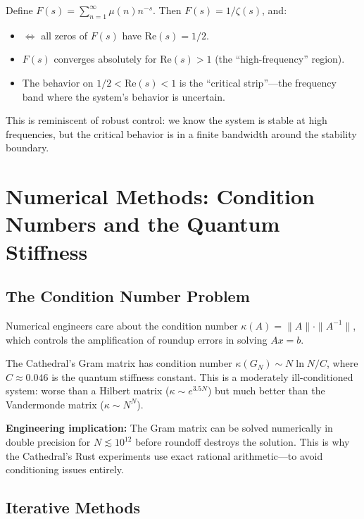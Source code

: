 \documentclass[11pt,a4paper]{article}
\begin{document}
Define $F(s) = \sum_{n=1}^{\infty} \mu(n) n^{-s}$. Then
$F(s) = 1/\zeta(s)$, and:
\begin{itemize}
  \item \RH{} $\iff$ all zeros of $F(s)$ have $\mathrm{Re}(s) = 1/2$.
  \item $F(s)$ converges absolutely for $\mathrm{Re}(s) > 1$ (the
    ``high-frequency'' region).
  \item The behavior on $1/2 < \mathrm{Re}(s) < 1$ is the ``critical
    strip''---the frequency band where the system's behavior is
    uncertain.
\end{itemize}

This is reminiscent of robust control: we know the system is stable
at high frequencies, but the critical behavior is in a finite
bandwidth around the stability boundary.

\section{Numerical Methods: Condition Numbers and the Quantum Stiffness}
\label{sec:numerical}

\subsection{The Condition Number Problem}

Numerical engineers care about the condition number
$\kappa(A) = \|A\| \cdot \|A^{-1}\|$, which controls the
amplification of roundup errors in solving $Ax = b$.

The Cathedral's Gram matrix has condition number
$\kappa(G_N) \sim N \ln N / C$, where $C \approx 0.046$ is the
quantum stiffness constant. This is a moderately ill-conditioned
system: worse than a Hilbert matrix ($\kappa \sim e^{3.5N}$) but
much better than the Vandermonde matrix ($\kappa \sim N^N$).

\textbf{Engineering implication:} The Gram matrix can be solved
numerically in double precision for $N \lesssim 10^{12}$ before
roundoff destroys the solution. This is why the Cathedral's Rust
experiments use exact rational arithmetic---to avoid conditioning
issues entirely.

\subsection{Iterative Methods}
\end{document}
